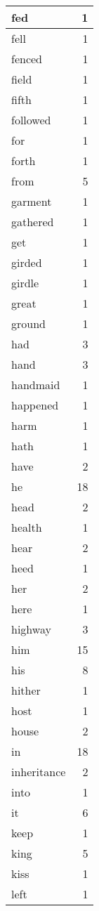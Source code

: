 \begin{center}
\begin{longtable}{l|r}
fed & 1 \\ \hline
fell & 1 \\ \hline
fenced & 1 \\ \hline
field & 1 \\ \hline
fifth & 1 \\ \hline
followed & 1 \\ \hline
for & 1 \\ \hline
forth & 1 \\ \hline
from & 5 \\ \hline
garment & 1 \\ \hline
gathered & 1 \\ \hline
get & 1 \\ \hline
girded & 1 \\ \hline
girdle & 1 \\ \hline
great & 1 \\ \hline
ground & 1 \\ \hline
had & 3 \\ \hline
hand & 3 \\ \hline
handmaid & 1 \\ \hline
happened & 1 \\ \hline
harm & 1 \\ \hline
hath & 1 \\ \hline
have & 2 \\ \hline
he & 18 \\ \hline
head & 2 \\ \hline
health & 1 \\ \hline
hear & 2 \\ \hline
heed & 1 \\ \hline
her & 2 \\ \hline
here & 1 \\ \hline
highway & 3 \\ \hline
him & 15 \\ \hline
his & 8 \\ \hline
hither & 1 \\ \hline
host & 1 \\ \hline
house & 2 \\ \hline
in & 18 \\ \hline
inheritance & 2 \\ \hline
into & 1 \\ \hline
it & 6 \\ \hline
keep & 1 \\ \hline
king & 5 \\ \hline
kiss & 1 \\ \hline
left & 1 \\ \hline

\end{longtable}
\end{center}
